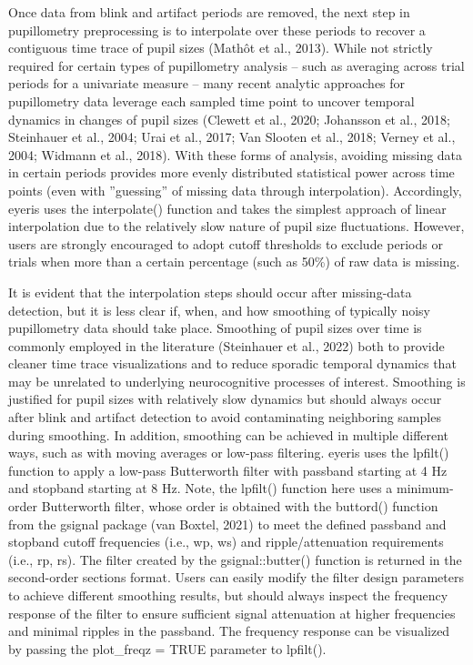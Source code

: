 Once data from blink and artifact periods are removed, the next step in pupillometry preprocessing is to interpolate over these periods to recover a contiguous time trace of pupil sizes (Mathôt et al., 2013). While not strictly required for certain types of pupillometry analysis – such as averaging across trial periods for a univariate measure – many recent analytic approaches for pupillometry data leverage each sampled time point to uncover temporal dynamics in changes of pupil sizes (Clewett et al., 2020; Johansson et al., 2018; Steinhauer et al., 2004; Urai et al., 2017; Van Slooten et al., 2018; Verney et al., 2004; Widmann et al., 2018). With these forms of analysis, avoiding missing data in certain periods provides more evenly distributed statistical power across time points (even with ”guessing” of missing data through interpolation). Accordingly, eyeris uses the interpolate() function and takes the simplest approach of linear interpolation due to the relatively slow nature of pupil size fluctuations. However, users are strongly encouraged to adopt cutoff thresholds to exclude periods or trials when more than a certain percentage (such as 50\%) of raw data is missing.

It is evident that the interpolation steps should occur after missing-data detection, but it is less clear if, when, and how smoothing of typically noisy pupillometry data should take place. Smoothing of pupil sizes over time is commonly employed in the literature (Steinhauer et al., 2022) both to provide cleaner time trace visualizations and to reduce sporadic temporal dynamics that may be unrelated to underlying neurocognitive processes of interest. Smoothing is justified for pupil sizes with relatively slow dynamics but should always occur after blink and artifact detection to avoid contaminating neighboring samples during smoothing. In addition, smoothing can be achieved in multiple different ways, such as with moving averages or low-pass filtering. eyeris uses the lpfilt() function to apply a low-pass Butterworth filter with passband starting at 4 Hz and stopband starting at 8 Hz. Note, the lpfilt() function here uses a minimum-order Butterworth filter, whose order is obtained with the buttord() function from the gsignal package (van Boxtel, 2021) to meet the defined passband and stopband cutoff frequencies (i.e., wp, ws) and ripple/attenuation requirements (i.e., rp, rs). The filter created by the gsignal::butter() function is returned in the second-order sections format. Users can easily modify the filter design parameters to achieve different smoothing results, but should always inspect the frequency response of the filter to ensure sufficient signal attenuation at higher frequencies and minimal ripples in the passband. The frequency response can be visualized by passing the plot\_freqz = TRUE parameter to lpfilt().

